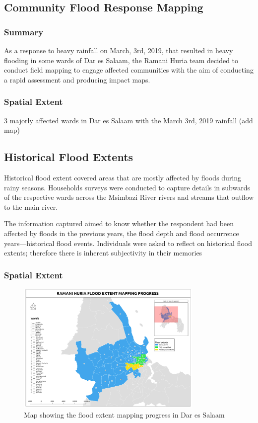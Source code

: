 \documentclass[a4paper,12pt,twoside]{article}
\begin{document}
\newpage
\subsection{Community Flood Response Mapping}
\subsubsection{Summary}
As a response to heavy rainfall on March, 3rd, 2019, that resulted in heavy flooding in some wards of Dar es Salaam, the Ramani Huria team decided to conduct field mapping to engage affected communities with the aim of conducting a rapid assessment and producing impact maps.
\subsubsection{Spatial Extent}
3 majorly affected wards in Dar es Salaam with the March 3rd, 2019 rainfall (add map)

\newpage
\subsection{Historical Flood Extents}

Historical flood extent covered areas that are mostly affected by floods during rainy seasons. Households surveys were conducted to capture details in  subwards of the respective wards across the Msimbazi River rivers and streams that outflow to the main river.

\medskip

The information captured aimed to know whether the respondent had been affected by floods in the previous years, the flood depth and flood occurrence years---historical flood events. Individuals were asked to reflect on historical flood extents; therefore there is inherent subjectivity in their memories

\subsubsection{Spatial Extent}

\begin{figure}[h]
  \color{RHgreen}\caption{Map showing the flood extent mapping progress in Dar es Salaam}
  \centering
  \includegraphics[width=0.8\textwidth]{images/RH_Flood_Extent_Progress.png}
\end{figure}
\end{document}
